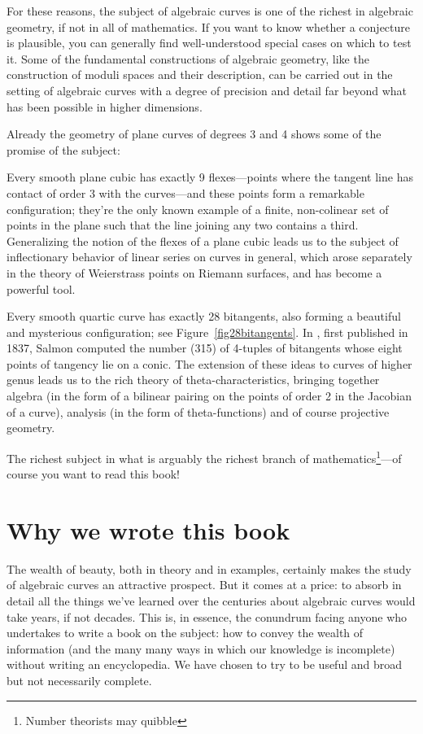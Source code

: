 For these reasons, the subject of algebraic curves is one of the richest in algebraic geometry, if not in all of mathematics. If you want to know whether a conjecture is plausible, you can generally find well-understood special cases on which to test it. Some of the fundamental constructions of algebraic geometry, like the construction of moduli spaces and their description, can be carried out in the setting of algebraic curves with a degree of precision and detail far beyond what has been possible in higher dimensions. 

Already the geometry of plane curves of degrees 3 and 4 shows some of the promise of the subject:

Every smooth plane cubic has exactly 9 flexes---points where the tangent line has contact of order 3 with the curves---and these points form a remarkable configuration; they're the only known example of a finite, non-colinear set of points in the plane such that the line joining any two contains a third. Generalizing the notion of the flexes of a plane cubic leads us to the subject of inflectionary behavior of linear series on curves in general, which arose separately in the theory of Weierstrass points on Riemann surfaces, and  has become a powerful tool. 

Every smooth quartic curve has exactly 28 bitangents, also forming a beautiful and mysterious configuration; see 
Figure~\ref{fig28bitangents}. In \cite{MR0115124}, first published in 1837, Salmon computed the number (315) of 4-tuples of bitangents whose eight points of tangency lie on a conic. The extension of these ideas to curves of higher genus leads us to the rich theory of theta-characteristics, bringing together algebra (in the form of a bilinear pairing on the points of order 2 in the Jacobian of a curve), analysis (in the form of theta-functions) and of course projective geometry.

The richest subject in what is arguably the richest branch of mathematics\footnote{Number theorists may quibble}---of course you want to read this book! 

\section{Why we wrote this book}

The wealth of beauty, both in theory and in examples, certainly makes the study of algebraic curves an attractive prospect. But it comes at a price: to absorb in detail all the things we've learned over the centuries about algebraic curves would take years, if not decades. This is, in essence, the conundrum facing anyone who undertakes to write a book on the subject: how to convey the wealth of information  (and the many many ways in which our knowledge is incomplete) without writing an encyclopedia. We have chosen to try to be useful and broad but not necessarily complete. 

